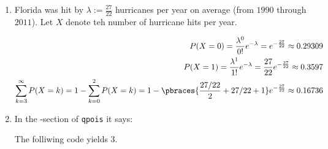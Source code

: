 \begin{solution}

\phantom{}

\begin{enumerate}[label = (\alph*)]

    \item Florida was hit by $\lambda := \frac{27}{22}$ hurricanes per year on average (from $1990$ through $2011$).
    Let $X$ denote teh number of hurricane hits per year.

    \begin{align}
        P(X = 0)
        =
        \frac{\lambda^0}{0!} e^{-\lambda}
        =
        e^{-\frac{27}{22}}
        \approx
        0.29309 \\
        P(X = 1)
        =
        \frac{\lambda^1}{1!} e^{-\lambda}
        =
        \frac{27}{22} e^{-\frac{27}{22}}
        \approx
        0.3597 \\
        \sum_{k=3}^\infty P(X = k)
        =
        1 - \sum_{k=0}^2 P(X = k)
        =
        1 - \pbraces
        {
            \frac{27 / 22}{2} + 27 / 22 + 1
        }
        e^{-\frac{27}{22}}
        \approx
        0.16736
    \end{align}

    \item In the -section of \texttt{qpois} it says:

    The folliwing code yields $3$.

    \lstset{style = fundament}
    

\end{enumerate}

\end{solution}

